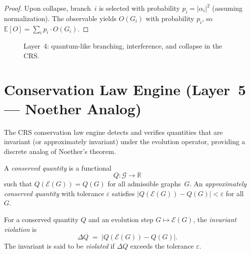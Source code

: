 \begin{proof}
Upon collapse, branch~$i$ is selected with probability
$p_i = |\alpha_i|^2$ (assuming normalization).  The observable
yields $O(G_i)$ with probability $p_i$, so
$\mathbb{E}[O] = \sum_i p_i \cdot O(G_i)$.
\end{proof}

\begin{figure}[t]
\centering
{}
\caption{Layer~4: quantum-like branching, interference, and
  collapse in the CRS.}
\label{fig:c11:branching}
\end{figure}

\section{Conservation Law Engine (Layer~5 --- Noether Analog)}
\label{sec:ch11:conservation}

The CRS conservation law engine detects and verifies quantities that
are invariant (or approximately invariant) under the evolution
operator, providing a discrete analog of Noether's theorem.

\begin{definition}
\label{def:11.26}
A \emph{conserved quantity} is a functional
\[
  Q \colon \mathcal{G} \to \mathbb{R}
\]
such that $Q(\mathcal{E}(G)) = Q(G)$ for all admissible graphs~$G$.
An \emph{approximately conserved quantity} with tolerance $\varepsilon$
satisfies $|Q(\mathcal{E}(G)) - Q(G)| < \varepsilon$ for all~$G$.
\end{definition}

\begin{definition}
\label{def:11.27}
For a conserved quantity $Q$ and an evolution step $G \mapsto
\mathcal{E}(G)$, the \emph{invariant violation} is
\begin{equation}
\label{eq:11.violation}
  \Delta Q \;=\; |Q(\mathcal{E}(G)) - Q(G)|.
\end{equation}
The invariant is said to be \emph{violated} if $\Delta Q$ exceeds
the tolerance $\varepsilon$.
\end{definition}

